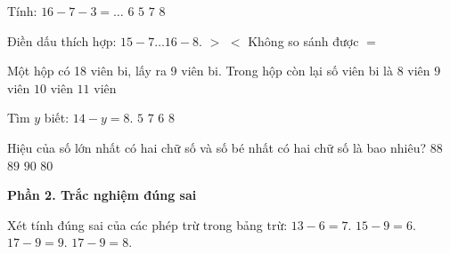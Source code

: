 \begin{ex} %
Tính: $16 - 7 - 3 = \dots$
\choice
{\True $6$}
{$5$}
{$7$}
{$8$}
\end{ex}

\begin{ex} %
Điền dấu thích hợp: $15 - 7 \dots 16 - 8$.
\choice
{$>$}
{$<$}
{Không so sánh được}
{\True $=$}
\end{ex}

\begin{ex} %
Một hộp có 18 viên bi, lấy ra 9 viên bi. Trong hộp còn lại số viên bi là
\choice
{$8$ viên}
{\True $9$ viên}
{$10$ viên}
{$11$ viên}
\end{ex}

\begin{ex} %
Tìm $y$ biết: $14 - y = 8$.
\choice
{$5$}
{$7$}
{\True $6$}
{$8$}
\end{ex}

\begin{ex} %
Hiệu của số lớn nhất có hai chữ số và số bé nhất có hai chữ số là bao nhiêu?
\choice
{$88$}
{\True $89$}
{$90$}
{$80$}
\end{ex}

\textbf{Phần 2. Trắc nghiệm đúng sai}

\begin{ex} %
Xét tính đúng sai của các phép trừ trong bảng trừ:
\choiceTF
{\True $13 - 6 = 7$.}
{\True $15 - 9 = 6$.}
{$17 - 9 = 9$.}
{\True $17 - 9 = 8$.}
\end{ex}

